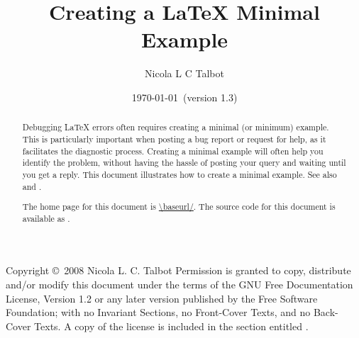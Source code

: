 \usepackage{graphicx}
\usepackage{makeidx}
\usepackage{datetime2}
\usepackage{alltt}
\usepackage[colorlinks]{hyperref}

\makeindex


\providecommand{\hyperpage}[1]{#1}
\providecommand{\meta}[1]{\emph{#1}}
\providecommand{\cls}[1]{\texttt{#1}}
\providecommand{\sty}[1]{\texttt{#1}}
\providecommand{\cs}[1]{\texttt{\textbackslash#1}}
\providecommand{\env}[1]{\texttt{#1}}


\title{Creating a LaTeX Minimal Example}
\author{Nicola L C Talbot}
\date{\today\ (version 1.3)}


\maketitle

\begin{abstract}
Debugging LaTeX errors often requires creating a minimal (or
minimum) example. This is particularly important when posting a bug
report or request for help, as it facilitates the diagnostic
process. Creating a minimal example will often help you identify the
problem, without having the hassle of posting your query and waiting
until you get a reply. This document illustrates how to create a
minimal example.  See also 
and
.

The home page for this document is \url{\baseurl/}.
The source code for this document is available as
.
\end{abstract}

Copyright \copyright\ 2008 Nicola L. C. Talbot Permission is granted to copy,
distribute and/or modify this document under the terms of the GNU
Free Documentation License, Version 1.2 or any later version
published by the Free Software Foundation; with no Invariant
Sections, no Front-Cover Texts, and no Back-Cover Texts. A copy of
the license is included in the section entitled . 

